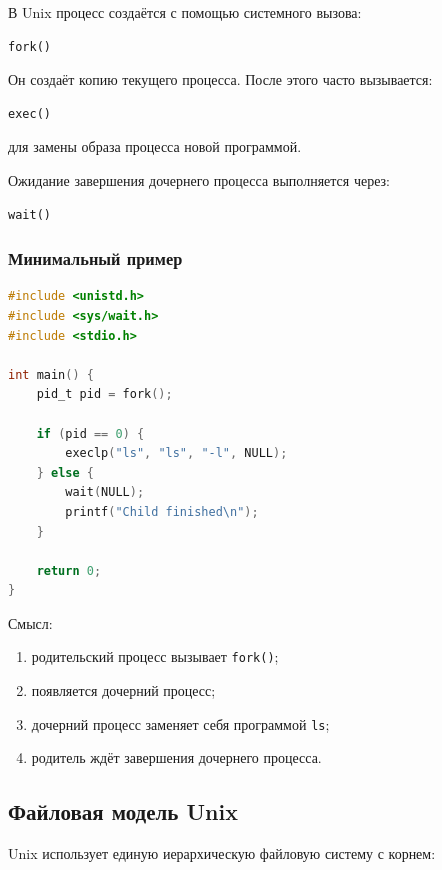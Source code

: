 \documentclass[12pt,a4paper]{article}
\begin{document}
В Unix процесс создаётся с помощью системного вызова:

\begin{lstlisting}[style=code]
fork()
\end{lstlisting}

Он создаёт копию текущего процесса. После этого часто вызывается:

\begin{lstlisting}[style=code]
exec()
\end{lstlisting}

для замены образа процесса новой программой.

Ожидание завершения дочернего процесса выполняется через:

\begin{lstlisting}[style=code]
wait()
\end{lstlisting}

\subsubsection*{Минимальный пример}

\begin{lstlisting}[style=code,language=C]
#include <unistd.h>
#include <sys/wait.h>
#include <stdio.h>

int main() {
    pid_t pid = fork();

    if (pid == 0) {
        execlp("ls", "ls", "-l", NULL);
    } else {
        wait(NULL);
        printf("Child finished\n");
    }

    return 0;
}
\end{lstlisting}

Смысл:

\begin{enumerate}
    \item родительский процесс вызывает \texttt{fork()};
    \item появляется дочерний процесс;
    \item дочерний процесс заменяет себя программой \texttt{ls};
    \item родитель ждёт завершения дочернего процесса.
\end{enumerate}

\subsection{Файловая модель Unix}

Unix использует единую иерархическую файловую систему с корнем:
\end{document}
